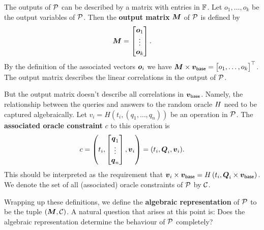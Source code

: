 The outputs of $\P$ can be described by a matrix with entries in $\F$.
Let $o_1, \dots, o_k$ be the output variables of $\P$.
Then the \textbf{output matrix} $\M$ of $\P$ is defined by
\[
  \M =
  \begin{bmatrix}
  \v o_1\\
  \vdots \\
  \v o_k
  \end{bmatrix}
  .
\]
By the definition of the associated vectors $\v o_i$ we have
$
\M \times \vbase = 
  \begin{bmatrix} 
  o_1, 
  \dots,
  o_k 
  \end{bmatrix}^\top
$.
The output matrix describes the linear correlations in the output of $\P$.

But the output matrix doesn't describe all correlations in $\vbase$.
Namely, the relationship between the queries and answers to the random oracle $\H$ need to be captured algebraically.
Let $v_i = H(t_i, (q_1, \dots, q_n))$ be an operation in $\P$.
The \textbf{associated oracle constraint} $c$ to this operation is
\[
  c = \left( t_i, \begin{bmatrix}
  \v q_1 \\
  \vdots \\
  \v q_n
  \end{bmatrix},
  \v v_i \right)
	=
	(t_i, \Q_i, \v v_i)
	.
\]
This should be interpreted as the requirement that
$
\v v_i \times \vbase = \H \left( t_i, \Q_i \times \vbase \right)
$.
We denote the set of all (associated) oracle constraints of $\P$ by $\C$.

Wrapping up these definitions,
we define the \textbf{algebraic representation} of $\P$ to be the tuple $(\M, \C)$.
A natural question that arises at this point is:
Does the algebraic representation determine the behaviour of $\P$ completely?
